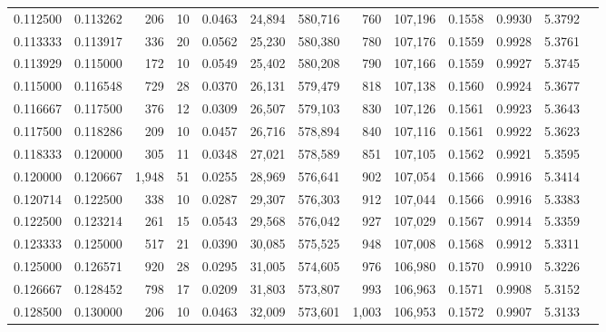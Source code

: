 \begin{tabular}{rrrrrrrrrrrrr}
0.112500 & 0.113262 &   206 &  10 &                                     0.0463 &  24,894 & 580,716 &     760 & 107,196 & 0.1558 & 0.9930 & 5.3792 \\
0.113333 & 0.113917 &   336 &  20 &                                     0.0562 &  25,230 & 580,380 &     780 & 107,176 & 0.1559 & 0.9928 & 5.3761 \\
0.113929 & 0.115000 &   172 &  10 &                                     0.0549 &  25,402 & 580,208 &     790 & 107,166 & 0.1559 & 0.9927 & 5.3745 \\
0.115000 & 0.116548 &   729 &  28 &                                     0.0370 &  26,131 & 579,479 &     818 & 107,138 & 0.1560 & 0.9924 & 5.3677 \\
0.116667 & 0.117500 &   376 &  12 &                                     0.0309 &  26,507 & 579,103 &     830 & 107,126 & 0.1561 & 0.9923 & 5.3643 \\
0.117500 & 0.118286 &   209 &  10 &                                     0.0457 &  26,716 & 578,894 &     840 & 107,116 & 0.1561 & 0.9922 & 5.3623 \\
0.118333 & 0.120000 &   305 &  11 &                                     0.0348 &  27,021 & 578,589 &     851 & 107,105 & 0.1562 & 0.9921 & 5.3595 \\
0.120000 & 0.120667 & 1,948 &  51 &                                     0.0255 &  28,969 & 576,641 &     902 & 107,054 & 0.1566 & 0.9916 & 5.3414 \\
0.120714 & 0.122500 &   338 &  10 &                                     0.0287 &  29,307 & 576,303 &     912 & 107,044 & 0.1566 & 0.9916 & 5.3383 \\
0.122500 & 0.123214 &   261 &  15 &                                     0.0543 &  29,568 & 576,042 &     927 & 107,029 & 0.1567 & 0.9914 & 5.3359 \\
0.123333 & 0.125000 &   517 &  21 &                                     0.0390 &  30,085 & 575,525 &     948 & 107,008 & 0.1568 & 0.9912 & 5.3311 \\
0.125000 & 0.126571 &   920 &  28 &                                     0.0295 &  31,005 & 574,605 &     976 & 106,980 & 0.1570 & 0.9910 & 5.3226 \\
0.126667 & 0.128452 &   798 &  17 &                                     0.0209 &  31,803 & 573,807 &     993 & 106,963 & 0.1571 & 0.9908 & 5.3152 \\
0.128500 & 0.130000 &   206 &  10 &                                     0.0463 &  32,009 & 573,601 &   1,003 & 106,953 & 0.1572 & 0.9907 & 5.3133 \\

\end{tabular}
